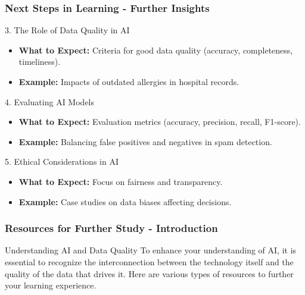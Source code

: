 \documentclass[aspectratio=169]{beamer}
\begin{document}
\begin{frame}[fragile]
    \frametitle{Next Steps in Learning - Further Insights}
    \begin{block}{3. The Role of Data Quality in AI}
        \begin{itemize}
            \item \textbf{What to Expect:} Criteria for good data quality (accuracy, completeness, timeliness).
            \item \textbf{Example:} Impacts of outdated allergies in hospital records.
        \end{itemize}
    \end{block}

    \begin{block}{4. Evaluating AI Models}
        \begin{itemize}
            \item \textbf{What to Expect:} Evaluation metrics (accuracy, precision, recall, F1-score).
            \item \textbf{Example:} Balancing false positives and negatives in spam detection.
        \end{itemize}
    \end{block}

    \begin{block}{5. Ethical Considerations in AI}
        \begin{itemize}
            \item \textbf{What to Expect:} Focus on fairness and transparency.
            \item \textbf{Example:} Case studies on data biases affecting decisions.
        \end{itemize}
    \end{block}
\end{frame}

\begin{frame}[fragile]
    \frametitle{Resources for Further Study - Introduction}
    \begin{block}{Understanding AI and Data Quality}
        To enhance your understanding of AI, it is essential to recognize the interconnection between the technology itself and the quality of the data that drives it.
        Here are various types of resources to further your learning experience.
    \end{block}
\end{frame}
\end{document}
